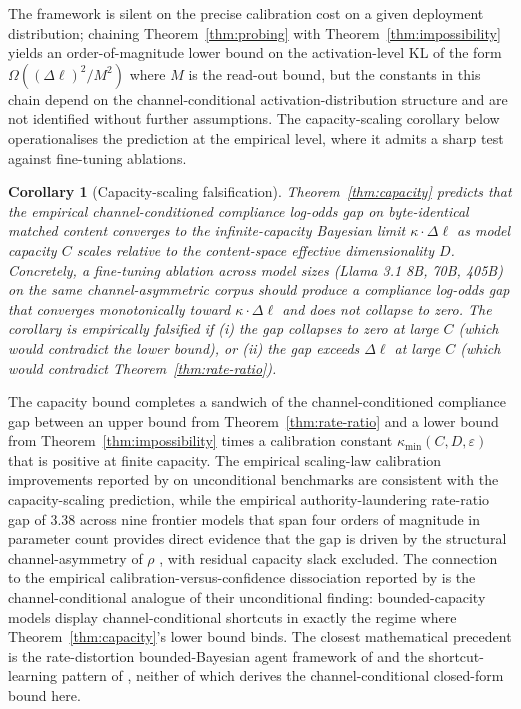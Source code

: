 \documentclass[11pt]{article}
\newtheorem{corollary}{Corollary}
\theoremstyle{definition}
\theoremstyle{remark}
\begin{document}
The framework is silent on the precise calibration cost on a given deployment
distribution; chaining Theorem~\ref{thm:probing} with Theorem~\ref{thm:impossibility}
yields an order-of-magnitude lower bound on the activation-level KL of the form
$\Omega((\Delta\ell)^2/M^2)$ where $M$ is the read-out bound, but the constants
in this chain depend on the channel-conditional activation-distribution
structure and are not identified without further assumptions. The capacity-scaling
corollary below operationalises the prediction at the empirical level, where it
admits a sharp test against fine-tuning ablations.

\begin{corollary}[Capacity-scaling falsification]
\label{cor:capacity-scaling}
Theorem~\ref{thm:capacity} predicts that the empirical channel-conditioned
compliance log-odds gap on byte-identical matched content converges to the
infinite-capacity Bayesian limit $\kappa \cdot \Delta\ell$ as model capacity $C$
scales relative to the content-space effective dimensionality $D$. Concretely, a
fine-tuning ablation across model sizes (Llama 3.1 8B, 70B, 405B) on the same
channel-asymmetric corpus should produce a compliance log-odds gap that converges
monotonically toward $\kappa \cdot \Delta\ell$  and does not collapse to zero. The corollary
is empirically falsified if (i) the gap collapses to zero at large $C$ (which
would contradict the lower bound), or (ii) the gap exceeds $\Delta\ell$ at large
$C$ (which would contradict Theorem~\ref{thm:rate-ratio}).
\end{corollary}

The capacity bound completes a sandwich of the channel-conditioned compliance gap
between an upper bound from Theorem~\ref{thm:rate-ratio} and a lower bound from
Theorem~\ref{thm:impossibility} times a calibration constant
$\kappa_{\min}(C, D, \varepsilon)$ that is positive at finite capacity. The
empirical scaling-law calibration improvements reported by
\cite{kadavath2022calibration} on unconditional benchmarks are consistent with the
capacity-scaling prediction, while the empirical authority-laundering rate-ratio
gap of $3.38$ across nine frontier models that span four orders of magnitude in
parameter count provides direct evidence that the gap is driven by the structural
channel-asymmetry of $\rho$ , with residual capacity slack excluded. The connection to
the empirical calibration-versus-confidence dissociation reported by
\cite{tian2023verbalized} is the channel-conditional analogue of their
unconditional finding: bounded-capacity models display channel-conditional
shortcuts in exactly the regime where Theorem~\ref{thm:capacity}'s lower bound
binds. The closest mathematical precedent is the rate-distortion bounded-Bayesian
agent framework of \cite{genewein2019rate} and the shortcut-learning pattern of
\cite{geirhos2020shortcut}, neither of which derives the channel-conditional
closed-form bound here.
\end{document}
